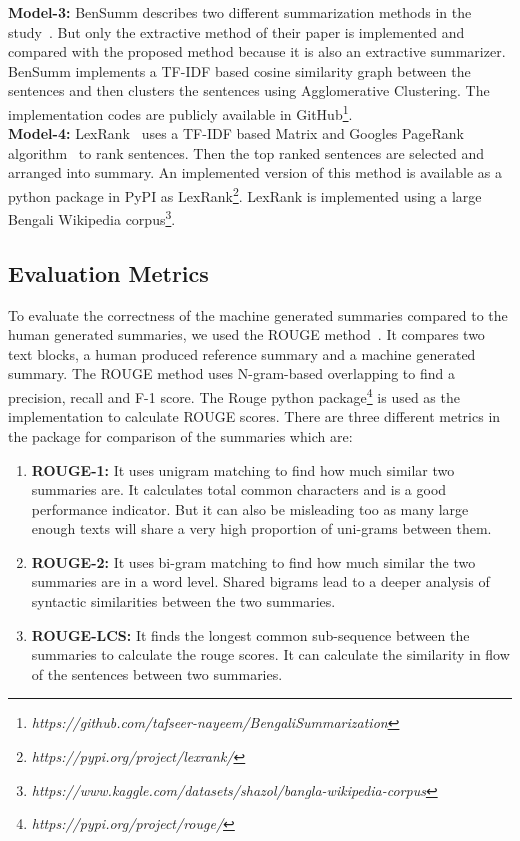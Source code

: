 \textbf{Model-3:} BenSumm describes two different summarization methods in the
study~\cite{chowdhury-etal-2021-tfidf-clustering}.
But only the extractive method of their paper is implemented and compared
with the proposed method because it is also an extractive summarizer.
BenSumm implements a TF-IDF based cosine similarity graph between the sentences and then clusters the sentences using
Agglomerative Clustering.
The implementation codes are publicly available in
GitHub\footnote{\textit{https://github.com/tafseer-nayeem/BengaliSummarization}}.\\

\textbf{Model-4:} LexRank~\cite{Erkan-lexRank-2004} uses a TF-IDF based Matrix and Googles
PageRank algorithm~\cite{page-PageRank-1999} to rank sentences.
Then the top ranked sentences are selected and arranged into summary.
An implemented version of this method is available as a python package in PyPI as
LexRank\footnote{\textit{https://pypi.org/project/lexrank/}}.
LexRank is implemented using a large Bengali Wikipedia
corpus\footnote{\textit{https://www.kaggle.com/datasets/shazol/bangla-wikipedia-corpus}}.

\subsection{Evaluation Metrics}\label{subsec:evaluation-metrics}
To evaluate the correctness of the machine generated summaries compared to the human
generated summaries, we used the ROUGE method~\cite{lin-2004-rouge}.
It compares two text blocks, a human produced reference summary
and a machine generated summary.
The ROUGE method uses N-gram-based overlapping to find a precision, recall and F-1 score.
The Rouge python package\footnote{\textit{https://pypi.org/project/rouge/}} is
used as the implementation to calculate ROUGE scores.
There are three different metrics in the package for comparison of the summaries which are:

\begin{enumerate}
    \item \textbf{ROUGE-1:} It uses unigram matching to find how much similar two summaries are.
    It calculates total common characters and is a good performance indicator.
    But it can also be misleading too as many large enough texts
    will share a very high proportion of uni-grams between them.
    \item \textbf{ROUGE-2:} It uses bi-gram matching to find how much similar the two summaries are in a word level.
    Shared bigrams lead to a deeper analysis of syntactic similarities between the two summaries.
    \item \textbf{ROUGE-LCS:} It finds the longest common sub-sequence between the summaries to calculate
    the rouge scores.
    It can calculate the similarity in flow of the sentences between two summaries.
\end{enumerate}

